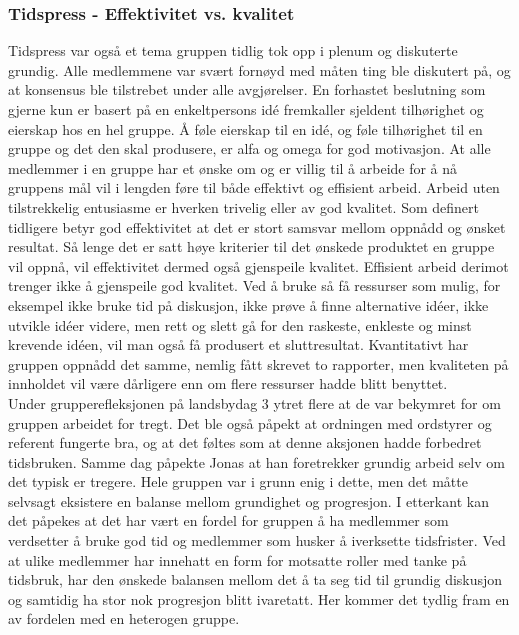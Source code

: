 \subsubsection{Tidspress - Effektivitet vs. kvalitet}
Tidspress var også et tema gruppen tidlig tok opp i plenum og diskuterte grundig.
Alle medlemmene var svært fornøyd med måten ting ble diskutert på, og at konsensus ble tilstrebet under alle avgjørelser.
En forhastet beslutning som gjerne kun er basert på en enkeltpersons id\'{e} fremkaller sjeldent tilhørighet og eierskap hos en hel gruppe.
Å føle eierskap til en id\'{e}, og føle tilhørighet til en gruppe og det den skal produsere, er alfa og omega for god motivasjon.
At alle medlemmer i en gruppe har et ønske om og er villig til å arbeide for å nå gruppens mål vil i lengden føre til både effektivt og effisient arbeid.
Arbeid uten tilstrekkelig entusiasme er hverken trivelig eller av god kvalitet.
Som definert tidligere betyr god effektivitet at det er stort samsvar mellom oppnådd og ønsket resultat.
Så lenge det er satt høye kriterier til det ønskede produktet en gruppe vil oppnå, vil effektivitet dermed også gjenspeile kvalitet.
Effisient arbeid derimot trenger ikke å gjenspeile god kvalitet.
Ved å bruke så få ressurser som mulig, for eksempel ikke bruke tid på diskusjon, ikke prøve å finne alternative id\'{e}er, ikke utvikle id\'{e}er videre, men rett og slett gå for den raskeste, enkleste og minst krevende id\'{e}en, vil man også få produsert et sluttresultat.
Kvantitativt har gruppen oppnådd det samme, nemlig fått skrevet to rapporter, men kvaliteten på innholdet vil være dårligere enn om flere ressurser hadde blitt benyttet.
\\
Under grupperefleksjonen på landsbydag 3 ytret flere at de var bekymret for om gruppen arbeidet for tregt.
Det ble også påpekt at ordningen med ordstyrer og referent fungerte bra, og at det føltes som at denne aksjonen hadde forbedret tidsbruken.
Samme dag påpekte Jonas at han foretrekker grundig arbeid selv om det typisk er tregere.
Hele gruppen var i grunn enig i dette, men det måtte selvsagt eksistere en balanse mellom grundighet og progresjon.
I etterkant kan det påpekes at det har vært en fordel for gruppen å ha medlemmer som verdsetter å bruke god tid og medlemmer som husker å iverksette tidsfrister.
Ved at ulike medlemmer har innehatt en form for motsatte roller med tanke på tidsbruk, har den ønskede balansen mellom det å ta seg tid til grundig diskusjon og samtidig ha stor nok progresjon blitt ivaretatt. 
Her kommer det tydlig fram en av fordelen med en heterogen gruppe.
